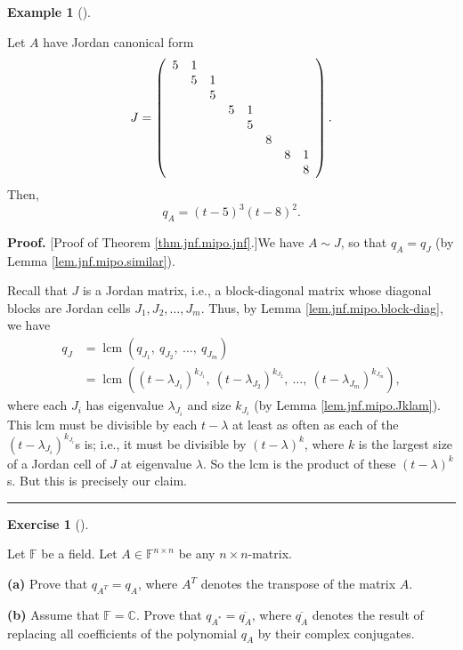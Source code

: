 \documentclass[numbers=enddot,12pt,final,onecolumn,notitlepage]{scrartcl}%
\newcounter{exer}
\numberwithin{exer}{subsection}
\theoremstyle{definition}
\newtheorem{exam}[theo]{Example}
\newenvironment{example}[1][]
{\begin{exam}[#1]\begin{leftbar}}
{\end{leftbar}\end{exam}}
\newtheorem{exmp}[exer]{Exercise}
\newenvironment{exercise}[1][]
{\begin{exmp}[#1]\begin{leftbar}}
{\end{leftbar}\end{exmp}}
\newenvironment{proof}[1][Proof]{\noindent\textbf{#1.} }{\ \rule{0.5em}{0.5em}}
\begin{document}
\begin{example}
Let $A$ have Jordan canonical form%
\[
J=\left(
\begin{array}
[c]{cccccccc}%
5 & 1 &  &  &  &  &  & \\
& 5 & 1 &  &  &  &  & \\
&  & 5 &  &  &  &  & \\
&  &  & 5 & 1 &  &  & \\
&  &  &  & 5 &  &  & \\
&  &  &  &  & 8 &  & \\
&  &  &  &  &  & 8 & 1\\
&  &  &  &  &  &  & 8
\end{array}
\right)  .
\]
Then,%
\[
q_{A}=\left(  t-5\right)  ^{3}\left(  t-8\right)  ^{2}.
\]

\end{example}

\begin{proof}
[Proof of Theorem \ref{thm.jnf.mipo.jnf}.]We have $A\sim J$, so that
$q_{A}=q_{J}$ (by Lemma \ref{lem.jnf.mipo.similar}).

Recall that $J$ is a Jordan matrix, i.e., a block-diagonal matrix whose
diagonal blocks are Jordan cells $J_{1},J_{2},\ldots,J_{m}$. Thus, by Lemma
\ref{lem.jnf.mipo.block-diag}, we have%
\begin{align*}
q_{J}  &  =\operatorname{lcm}\left(  q_{J_{1}},\ q_{J_{2}},\ \ldots
,\ q_{J_{m}}\right) \\
&  =\operatorname{lcm}\left(  \left(  t-\lambda_{J_{1}}\right)  ^{k_{J_{1}}%
},\ \left(  t-\lambda_{J_{2}}\right)  ^{k_{J_{2}}},\ \ldots,\ \left(
t-\lambda_{J_{m}}\right)  ^{k_{J_{m}}}\right)  ,
\end{align*}
where each $J_{i}$ has eigenvalue $\lambda_{J_{i}}$ and size $k_{J_{i}}$ (by
Lemma \ref{lem.jnf.mipo.Jklam}). This lcm must be divisible by each
$t-\lambda$ at least as often as each of the $\left(  t-\lambda_{J_{i}%
}\right)  ^{k_{J_{i}}}$s is; i.e., it must be divisible by $\left(
t-\lambda\right)  ^{k}$, where $k$ is the largest size of a Jordan cell of $J$
at eigenvalue $\lambda$. So the lcm is the product of these $\left(
t-\lambda\right)  ^{k}$s. But this is precisely our claim.
\end{proof}

\begin{exercise}
 Let $\mathbb{F}$ be a field. Let $A\in\mathbb{F}^{n\times n}$ be any
$n\times n$-matrix. \medskip

\textbf{(a)} Prove that $q_{A^{T}}=q_{A}$, where $A^{T}$ denotes the transpose
of the matrix $A$. \medskip

\textbf{(b)} Assume that $\mathbb{F}=\mathbb{C}$. Prove that $q_{A^{\ast}%
}=\overline{q_{A}}$, where $\overline{q_{A}}$ denotes the result of replacing
all coefficients of the polynomial $q_{A}$ by their complex conjugates.
\end{exercise}
\end{document}
